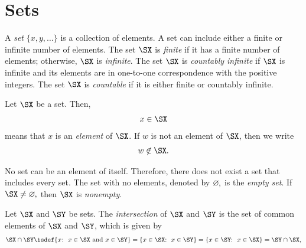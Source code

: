 \section{Sets}

A {\it set} $\{x,y,\ldots\}$ is a collection of elements.
A set can include either a finite or infinite number of elements.
The set $\SX$ is {\it finite} if it has a finite number of elements; otherwise, $\SX$ is {\it infinite}.
%
The set $\SX$ is {\it countably infinite} if $\SX$ is infinite and its elements are in one-to-one correspondence with the positive integers. The set $\SX$ is {\it countable} if it is either finite or countably infinite.

Let $\SX$ be a set.
Then, \begin{align}x\in \SX\end{align} means that $x$ is an {\it element}
\label{insym}%
%
of $\SX$. If $w$ is not an element of $\SX$, then we write
\begin{align}w\not\in \SX.\end{align}
\label{notinsym}

No set can be an element of itself.  Therefore, there does not exist a set that includes every set.  The set with no elements, denoted by $\varnothing\mspace{-1mu},$ is the {\it empty set}.
%
\label{varnothingsym}%
%
%
If $\SX\not=\varnothing\mspace{-1mu},$ then $\SX$ is {\it nonempty}.

Let $\SX$ and $\SY$ be sets. The {\it intersection}
%
of $\SX$ and $\SY$ is the set of common elements of $\SX$ and
$\SY$, which is given by
\begin{align}
\SX\cap \SY
%
\isdef\{x\mspace{-1mu}\colon\ x\in \SX \mbox{ and } x\in \SY \}
%
=  \{ x\in \SX \mspace{-2mu}\colon\ x\in \SY \}
%
=\{x\in \SY\mspace{-2mu}\colon\ x\in \SX \}
%
= \SY \cap \SX,\end{align}
